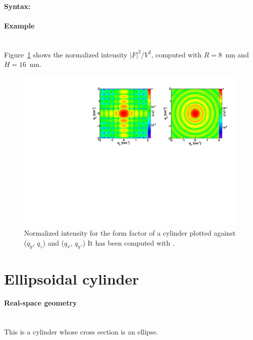 \paragraph{Syntax:} 

\newpage

\paragraph{Example}\mbox{}\\
Figure~\ref{fig:FFcylinderEx} shows the normalized intensity
$|F|^2/V^2$, computed with $R=8$~nm and \mbox{$H=16$~nm.}
\begin{figure}[h]
\begin{center}
\includegraphics[width=\textwidth]{Figures/figffcylinder}
\end{center}
\caption{Normalized intensity for the form factor of a cylinder plotted against ($q_y$, $q_z$) and  ($q_x$, $q_y$.) It
has been  computed with .}
\label{fig:FFcylinderEx}
\end{figure}

\newpage%
\section{Ellipsoidal cylinder}  

\paragraph{Real-space geometry}\mbox{}\\
This is a cylinder whose cross section is an ellipse.

